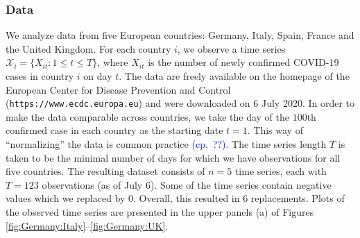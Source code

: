 \documentclass[a4paper,12pt]{article}
\numberwithin{equation}{section}
\begin{document}





\subsubsection{Data}


We analyze data from five European countries: Germany, Italy, Spain, France and the United Kingdom. For each country $i$, we observe a time series $\mathcal{X}_i = \{ X_{it}: 1 \le t \le T \}$, where $X_{it}$ is the number of newly confirmed COVID-19 cases in country $i$ on day $t$. The data are freely available on the homepage of the European Center for Disease Prevention and Control (\texttt{https://www.ecdc.europa.eu}) and were downloaded on 6 July 2020. In order to make the data comparable across countries, we take the day of the $100$th confirmed case in each country as the starting date $t=1$. This way of ``normalizing'' the data is common practice \textcolor{blue}{(cp.\ ??)}. The time series length $T$ is taken to be the minimal number of days for which we have observations for all five countries. The resulting dataset consists of $n = 5$ time series, each with $T = 123$ observations (as of July 6). Some of the time series contain negative values which we replaced by $0$. Overall, this resulted in $6$ replacements. Plots of the observed time series are presented in the upper panels (a) of Figures \ref{fig:Germany:Italy}--\ref{fig:Germany:UK}.
\end{document}
